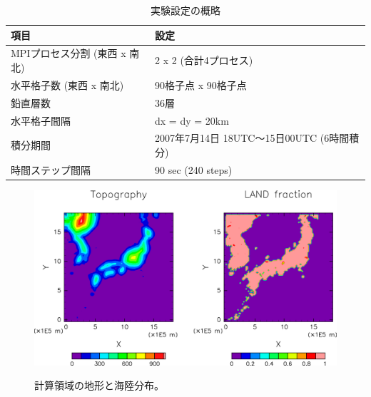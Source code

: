 \begin{table}[h]
\begin{center}
  \caption{実験設定の概略}
  \label{tab:grids}
  \begin{tabularx}{150mm}{|l|X|} \hline
    \rowcolor[gray]{0.9} 項目 & 設定 \\ \hline
    MPIプロセス分割 (東西 x 南北) & 2 x 2 (合計4プロセス) \\ \hline
    水平格子数 (東西 x 南北) & 90格子点 x 90格子点 \\ \hline
    鉛直層数                 & 36層                  \\ \hline
    水平格子間隔             & dx = dy = 20km       \\ \hline
    積分期間 & 2007年7月14日 18UTC～15日00UTC (6時間積分) \\ \hline
    時間ステップ間隔 & 90 sec (240 steps) \\ \hline
  \end{tabularx}
\end{center}
\end{table}

\begin{figure}[tb]
\begin{center}
  \includegraphics[width=1.0\hsize]{./figure/real_domain.eps}\\
  \caption{計算領域の地形と海陸分布。}
  \label{fig:tutrial_real_domain}
\end{center}
\end{figure}


